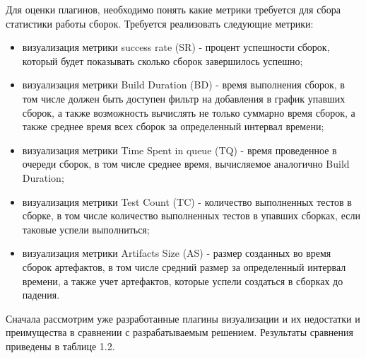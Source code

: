 Для оценки плагинов, необходимо понять какие метрики требуется для сбора статистики работы сборок. Требуется реализовать следующие метрики:

\begin{itemize}
	\item визуализация метрики success rate (SR) - процент успешности сборок, который будет показывать сколько сборок завершилось успешно;
	\item визуализация метрики Build Duration (BD) - время выполнения сборок, в том числе должен быть доступен фильтр на добавления в график упавших сборок, а также возможность вычислять не только суммарно время сборок, а также среднее время всех сборок за определенный интервал времени;
	\item визуализация метрики Time Spent in queue (TQ) - время проведенное в очереди сборок, в том числе среднее время, вычисляемое аналогично Build Duration;
	\item  визуализация метрики Test Count (TC) - количество выполненных тестов в сборке, в том числе количество выполненных тестов в упавших сборках, если таковые успели выполниться;
	\item визуализация метрики Artifacts Size (AS) - размер созданных во время сборок артефактов, в том числе средний размер за определенный интервал времени, а также учет артефактов, которые успели создаться в сборках до падения.
\end{itemize}

Сначала рассмотрим уже разработанные плагины визуализации и их недостатки и преимущества в сравнении с разрабатываемым решением. Результаты сравнения приведены в таблице 1.2.

